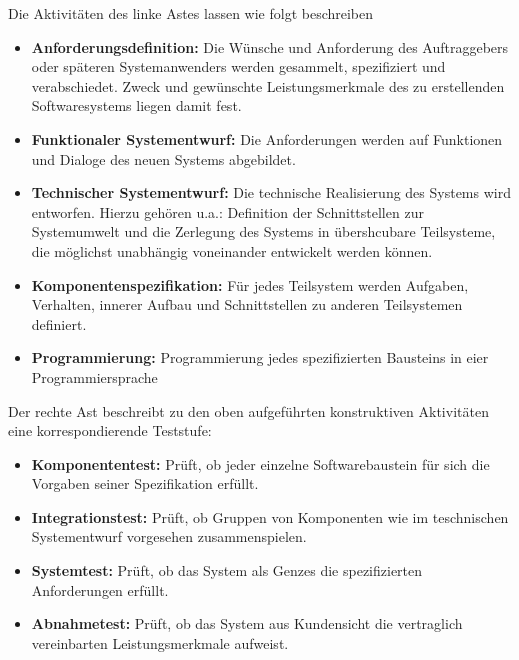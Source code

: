 Die Aktivitäten des linke Astes lassen wie folgt beschreiben \cite{spillner_basiswissen_2007}

\begin{itemize}
      \item \textbf{Anforderungsdefinition:} Die Wünsche und Anforderung des Auftraggebers oder späteren Systemanwenders werden gesammelt, spezifiziert und verabschiedet. Zweck und gewünschte Leistungsmerkmale des zu erstellenden Softwaresystems liegen damit fest.
      \item \textbf{Funktionaler Systementwurf:} Die Anforderungen werden auf Funktionen und Dialoge des neuen Systems abgebildet.
      \item \textbf{Technischer Systementwurf:} Die technische Realisierung des Systems wird entworfen. Hierzu gehören u.a.: Definition der Schnittstellen zur Systemumwelt und die Zerlegung des Systems in übershcubare Teilsysteme, die möglichst unabhängig voneinander entwickelt werden können.
      \item \textbf{Komponentenspezifikation:} Für jedes Teilsystem werden Aufgaben, Verhalten, innerer Aufbau und Schnittstellen zu anderen Teilsystemen definiert.
      \item \textbf{Programmierung:} Programmierung jedes spezifizierten Bausteins in eier Programmiersprache 
\end{itemize}


Der rechte Ast beschreibt zu den oben aufgeführten konstruktiven Aktivitäten eine korrespondierende Teststufe: \cite{spillner_basiswissen_2007}

\begin{itemize}
      \item \textbf{Komponententest:} Prüft, ob jeder einzelne Softwarebaustein für sich die Vorgaben seiner Spezifikation erfüllt.
      \item \textbf{Integrationstest:} Prüft, ob Gruppen von Komponenten wie im teschnischen Systementwurf vorgesehen zusammenspielen.
      \item \textbf{Systemtest:} Prüft, ob das System als Genzes die spezifizierten Anforderungen erfüllt.
      \item \textbf{Abnahmetest:} Prüft, ob das System aus Kundensicht die vertraglich vereinbarten Leistungsmerkmale aufweist.
\end{itemize}
